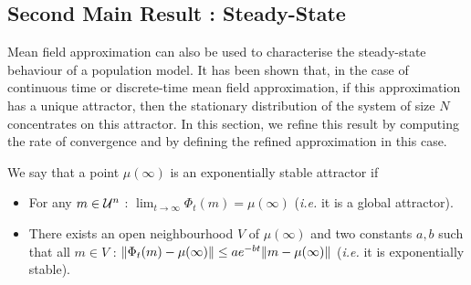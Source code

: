 \documentclass[review]{elsarticle}
\begin{document}
\subsection{Second Main Result : Steady-State}
\label{ssec:steady}

Mean field approximation can also be used to characterise the
steady-state behaviour of a population model. It has been shown that,
in the case of continuous time or discrete-time mean field
approximation, if this approximation has a unique attractor, then the
stationary distribution of the system of size $N$ concentrates on this
attractor. In this section, we refine this result by computing the
rate of convergence and by defining the refined approximation in this
case.

We say that a point $\mu(\infty)$ is an exponentially stable attractor
if
\begin{itemize}
\item For any $m\in{\cal U}^n$ : $\lim_{t\to\infty}\Phi_t(m)=\mu(\infty)$
  (\emph{i.e.} it is a global attractor).
\item There exists an open neighbourhood $V$ of $\mu(\infty)$ and two
  constants $a,b$ such that all $m\in V$ :
  $\norm{\Phi_t(m)-\mu(\infty)}\le a e^{-bt}\norm{m-\mu(\infty)}$
  (\emph{i.e.}  it is exponentially stable).
\end{itemize}
\end{document}
